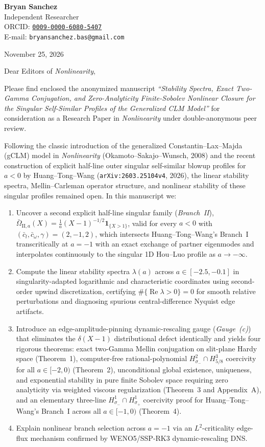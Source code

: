 \documentclass[10.5pt,letterpaper]{article}
\begin{document}
\textbf{Bryan Sanchez}\\
Independent Researcher\\
ORCID: \href{https://orcid.org/0009-0000-6080-5407}{\texttt{0009-0000-6080-5407}}\\
E-mail: \texttt{bryansanchez.bas@gmail.com}

\vspace{0.3em}
November 25, 2026

\vspace{0.3em}
Dear Editors of \emph{Nonlinearity},

Please find enclosed the anonymized manuscript \emph{``Stability Spectra, Exact Two-Gamma Conjugation, and Zero-Analyticity Finite-Sobolev Nonlinear Closure for the Singular Self-Similar Profiles of the Generalized CLM Model''} for consideration as a Research Paper in \emph{Nonlinearity} under double-anonymous peer review.

Following the classic introduction of the generalized Constantin--Lax--Majda (gCLM) model in \emph{Nonlinearity} (Okamoto--Sakajo--Wunsch, 2008) and the recent construction of explicit half-line outer singular self-similar blowup profiles for $a < 0$ by Huang--Tong--Wang (\texttt{arXiv:2603.25104v4}, 2026), the linear stability spectra, Mellin--Carleman operator structure, and nonlinear stability of these singular profiles remained open. In this manuscript we:
\begin{enumerate}
  \item Uncover a second explicit half-line singular family (\emph{Branch~II}), $\bar\Omega_{\mathrm{II},a}(X) = \frac{1}{a}(X-1)^{-1/2}\mathbf{1}_{\{X>1\}}$, valid for every $a < 0$ with $(\bar c_l, \bar c_\omega, \gamma) = (2,-1,2)$, which intersects Huang--Tong--Wang's Branch~I transcritically at $a = -1$ with an exact exchange of partner eigenmodes and interpolates continuously to the singular 1D Hou--Luo profile as $a \to -\infty$.
  \item Compute the linear stability spectra $\lambda(a)$ across $a \in [-2.5, -0.1]$ in singularity-adapted logarithmic and characteristic coordinates using second-order upwind discretization, certifying $\#\{\operatorname{Re}\lambda > 0\} = 0$ for smooth relative perturbations and diagnosing spurious central-difference Nyquist edge artifacts.
  \item Introduce an edge-amplitude-pinning dynamic-rescaling gauge (\emph{Gauge~(c)}) that eliminates the $\delta(X-1)$ distributional defect identically and yields four rigorous theorems: exact two-Gamma Mellin conjugation on slit-plane Hardy space (Theorem~1), computer-free rational-polynomial $H^2_{\sigma_-}\cap H^3_{5/8}$ coercivity for all $a \in [-2,0)$ (Theorem~2), unconditional global existence, uniqueness, and exponential stability in pure finite Sobolev space requiring zero analyticity via weighted viscous regularization (Theorem~3 and Appendix~A), and an elementary three-line $H^1_{\sigma_-}\cap H^1_{\sigma_+}$ coercivity proof for Huang--Tong--Wang's Branch~I across all $a \in [-1,0)$ (Theorem~4).
  \item Explain nonlinear branch selection across $a = -1$ via an $L^2$-criticality edge-flux mechanism confirmed by WENO5/SSP-RK3 dynamic-rescaling DNS.
\end{enumerate}
\end{document}
